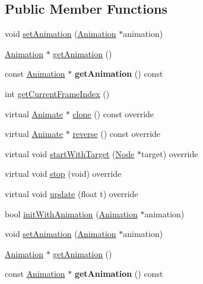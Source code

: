 \subsection*{Public Member Functions}
\begin{DoxyCompactItemize}
\item 
void \hyperlink{classAnimate_a041aefb7a2f9398a962bb9b37888af05}{set\+Animation} (\hyperlink{classAnimation}{Animation} $\ast$animation)
\item 
\hyperlink{classAnimation}{Animation} $\ast$ \hyperlink{classAnimate_aa5a0ca4d90430f3701129e068a4282f6}{get\+Animation} ()
\item 
\mbox{\label{classAnimate_afb97e19748e233716aa557cac78872b6}} 
const \hyperlink{classAnimation}{Animation} $\ast$ {\bfseries get\+Animation} () const
\item 
int \hyperlink{classAnimate_a0817746a8202c5e57b45762ada7e7a32}{get\+Current\+Frame\+Index} ()
\item 
virtual \hyperlink{classAnimate}{Animate} $\ast$ \hyperlink{classAnimate_a1c234e715c559e4482d7f955cf3f3e2d}{clone} () const override
\item 
virtual \hyperlink{classAnimate}{Animate} $\ast$ \hyperlink{classAnimate_a30f0bdbce81651636bae3ad34b5b64b8}{reverse} () const override
\item 
virtual void \hyperlink{classAnimate_ad9c0defb552a4bd8bfbc4d9dad96c59b}{start\+With\+Target} (\hyperlink{classNode}{Node} $\ast$target) override
\item 
virtual void \hyperlink{classAnimate_a546b7b7817303ad58f57c6c97d64c4ed}{stop} (void) override
\item 
virtual void \hyperlink{classAnimate_ae86fbd3249e9272b1d35d7256d6bcfd6}{update} (float t) override
\item 
bool \hyperlink{classAnimate_a12360cf2067d0dfa3470ff2a3c248c34}{init\+With\+Animation} (\hyperlink{classAnimation}{Animation} $\ast$animation)
\item 
void \hyperlink{classAnimate_a041aefb7a2f9398a962bb9b37888af05}{set\+Animation} (\hyperlink{classAnimation}{Animation} $\ast$animation)
\item 
\hyperlink{classAnimation}{Animation} $\ast$ \hyperlink{classAnimate_aa5a0ca4d90430f3701129e068a4282f6}{get\+Animation} ()
\item 
\mbox{\label{classAnimate_afb97e19748e233716aa557cac78872b6}} 
const \hyperlink{classAnimation}{Animation} $\ast$ {\bfseries get\+Animation} () const

\end{DoxyCompactItemize}
